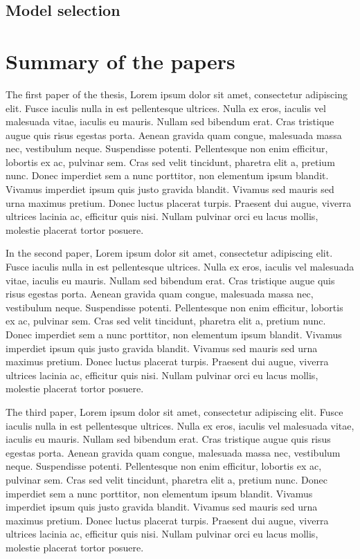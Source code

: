 \section{Model selection}
\label{sec:model selection}




\chapter{Summary of the papers}

The first paper of the thesis, Lorem ipsum dolor sit amet, consectetur adipiscing elit. Fusce iaculis nulla in est pellentesque ultrices. Nulla ex eros, iaculis vel malesuada vitae, iaculis eu mauris. Nullam sed bibendum erat. Cras tristique augue quis risus egestas porta. Aenean gravida quam congue, malesuada massa nec, vestibulum neque. Suspendisse potenti. Pellentesque non enim efficitur, lobortis ex ac, pulvinar sem. Cras sed velit tincidunt, pharetra elit a, pretium nunc. Donec imperdiet sem a nunc porttitor, non elementum ipsum blandit. Vivamus imperdiet ipsum quis justo gravida blandit. Vivamus sed mauris sed urna maximus pretium. Donec luctus placerat turpis. Praesent dui augue, viverra ultrices lacinia ac, efficitur quis nisi. Nullam pulvinar orci eu lacus mollis, molestie placerat tortor posuere.


In the second paper, Lorem ipsum dolor sit amet, consectetur adipiscing elit. Fusce iaculis nulla in est pellentesque ultrices. Nulla ex eros, iaculis vel malesuada vitae, iaculis eu mauris. Nullam sed bibendum erat. Cras tristique augue quis risus egestas porta. Aenean gravida quam congue, malesuada massa nec, vestibulum neque. Suspendisse potenti. Pellentesque non enim efficitur, lobortis ex ac, pulvinar sem. Cras sed velit tincidunt, pharetra elit a, pretium nunc. Donec imperdiet sem a nunc porttitor, non elementum ipsum blandit. Vivamus imperdiet ipsum quis justo gravida blandit. Vivamus sed mauris sed urna maximus pretium. Donec luctus placerat turpis. Praesent dui augue, viverra ultrices lacinia ac, efficitur quis nisi. Nullam pulvinar orci eu lacus mollis, molestie placerat tortor posuere.


The third paper, Lorem ipsum dolor sit amet, consectetur adipiscing elit. Fusce iaculis nulla in est pellentesque ultrices. Nulla ex eros, iaculis vel malesuada vitae, iaculis eu mauris. Nullam sed bibendum erat. Cras tristique augue quis risus egestas porta. Aenean gravida quam congue, malesuada massa nec, vestibulum neque. Suspendisse potenti. Pellentesque non enim efficitur, lobortis ex ac, pulvinar sem. Cras sed velit tincidunt, pharetra elit a, pretium nunc. Donec imperdiet sem a nunc porttitor, non elementum ipsum blandit. Vivamus imperdiet ipsum quis justo gravida blandit. Vivamus sed mauris sed urna maximus pretium. Donec luctus placerat turpis. Praesent dui augue, viverra ultrices lacinia ac, efficitur quis nisi. Nullam pulvinar orci eu lacus mollis, molestie placerat tortor posuere.
